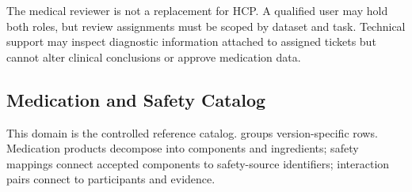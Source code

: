 The medical reviewer is not a replacement for HCP. A qualified user may hold both roles, but review assignments must be scoped by dataset and task. Technical support may inspect diagnostic information attached to assigned tickets but cannot alter clinical conclusions or approve medication data.

\subsection{Medication and Safety Catalog}

This domain is the controlled reference catalog.  groups version-specific rows. Medication products decompose into components and ingredients; safety mappings connect accepted components to safety-source identifiers; interaction pairs connect to participants and evidence.


